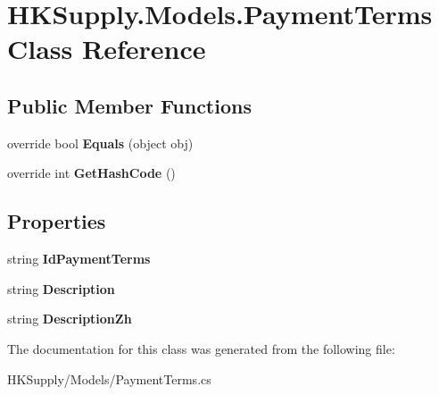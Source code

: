 \hypertarget{class_h_k_supply_1_1_models_1_1_payment_terms}{}\section{H\+K\+Supply.\+Models.\+Payment\+Terms Class Reference}
\label{class_h_k_supply_1_1_models_1_1_payment_terms}
\subsection*{Public Member Functions}
\begin{DoxyCompactItemize}
\item 
\mbox{\label{class_h_k_supply_1_1_models_1_1_payment_terms_a6a4a6c14601b1191183297299a34d2b7}} 
override bool {\bfseries Equals} (object obj)
\item 
\mbox{\label{class_h_k_supply_1_1_models_1_1_payment_terms_a356d38d5706d1d603c49108fda2bc25c}} 
override int {\bfseries Get\+Hash\+Code} ()
\end{DoxyCompactItemize}
\subsection*{Properties}
\begin{DoxyCompactItemize}
\item 
\mbox{\label{class_h_k_supply_1_1_models_1_1_payment_terms_ac8538b2245e189a57b206e205d9d27c8}} 
string {\bfseries Id\+Payment\+Terms}
\item 
\mbox{\label{class_h_k_supply_1_1_models_1_1_payment_terms_a43198b6d614f87a52890630d22f9ee20}} 
string {\bfseries Description}
\item 
\mbox{\label{class_h_k_supply_1_1_models_1_1_payment_terms_a503d35f8f8a8d2853ce141714a463fda}} 
string {\bfseries Description\+Zh}
\end{DoxyCompactItemize}


The documentation for this class was generated from the following file\+:\begin{DoxyCompactItemize}
\item 
H\+K\+Supply/\+Models/Payment\+Terms.\+cs\end{DoxyCompactItemize}

